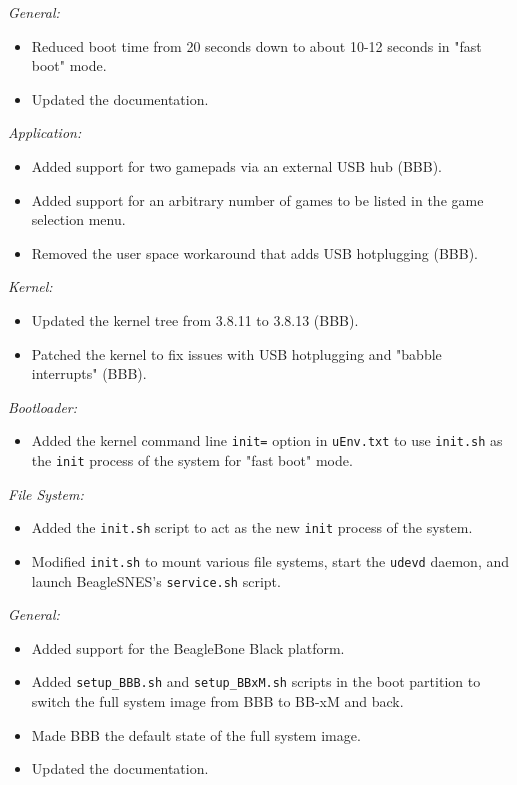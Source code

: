 
\noindent{}\emph{General:}
\begin{itemize}
\item Reduced boot time from 20 seconds down to about 10-12 seconds in "fast boot" mode.
\item Updated the documentation.
\end{itemize}

\noindent{}\emph{Application:}
\begin{itemize}
\item Added support for two gamepads via an external USB hub (BBB).
\item Added support for an arbitrary number of games to be listed in the game selection menu.
\item Removed the user space workaround that adds USB hotplugging (BBB).
\end{itemize}

\noindent{}\emph{Kernel:}
\begin{itemize}
\item Updated the kernel tree from 3.8.11 to 3.8.13 (BBB).
\item Patched the kernel to fix issues with USB hotplugging and "babble interrupts" (BBB).
\end{itemize}

\noindent{}\emph{Bootloader:}
\begin{itemize}
\item Added the kernel command line \texttt{init=} option in \texttt{uEnv.txt} to use \texttt{init.sh} as the \texttt{init} process of the system for "fast boot" mode.
\end{itemize}

\noindent{}\emph{File System:}
\begin{itemize}
\item Added the \texttt{init.sh} script to act as the new \texttt{init} process of the system.
\item Modified \texttt{init.sh} to mount various file systems, start the \texttt{udevd} daemon, and launch BeagleSNES's \texttt{service.sh} script.
\end{itemize}


\noindent{}\emph{General:}
\begin{itemize}
\item Added support for the BeagleBone Black platform.
\item Added \texttt{setup\_BBB.sh} and \texttt{setup\_BBxM.sh} scripts in the boot partition to switch the full system image from BBB to BB-xM and back.
\item Made BBB the default state of the full system image.
\item Updated the documentation.
\end{itemize}

